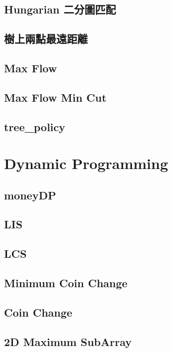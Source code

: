 \subsection{Hungarian 二分圖匹配}

\subsection{樹上兩點最遠距離}

\subsection{Max Flow}

\subsection{Max Flow Min Cut}

\subsection{tree_policy}


\section{Dynamic Programming}
\subsection{moneyDP}

\subsection{LIS}

\subsection{LCS}

\subsection{Minimum Coin Change}

\subsection{Coin Change}

\subsection{2D Maximum SubArray}


